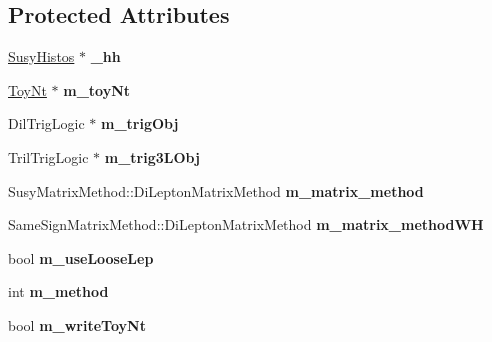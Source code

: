 \subsection*{Protected Attributes}
\begin{DoxyCompactItemize}
\item 
\hypertarget{classSusyBaseAna_a367bd65db63346df07ddd580294af668}{
\hyperlink{classSusyHistos}{SusyHistos} $\ast$ {\bfseries \_\-hh}}
\label{classSusyBaseAna_a367bd65db63346df07ddd580294af668}

\item 
\hypertarget{classSusyBaseAna_a442fc5acd64350b7af670237a3caa2bd}{
\hyperlink{classToyNt}{ToyNt} $\ast$ {\bfseries m\_\-toyNt}}
\label{classSusyBaseAna_a442fc5acd64350b7af670237a3caa2bd}

\item 
\hypertarget{classSusyBaseAna_a222bf62a46a03eebda35c795d0e1f46b}{
DilTrigLogic $\ast$ {\bfseries m\_\-trigObj}}
\label{classSusyBaseAna_a222bf62a46a03eebda35c795d0e1f46b}

\item 
\hypertarget{classSusyBaseAna_ae93079dc51825393f6c3f70759a03f2d}{
TrilTrigLogic $\ast$ {\bfseries m\_\-trig3LObj}}
\label{classSusyBaseAna_ae93079dc51825393f6c3f70759a03f2d}

\item 
\hypertarget{classSusyBaseAna_ae5de4586a5d7d2eb20f1ad4ce8ed87d6}{
SusyMatrixMethod::DiLeptonMatrixMethod {\bfseries m\_\-matrix\_\-method}}
\label{classSusyBaseAna_ae5de4586a5d7d2eb20f1ad4ce8ed87d6}

\item 
\hypertarget{classSusyBaseAna_ac1177a441f9e79e014cc936c98e9dca9}{
SameSignMatrixMethod::DiLeptonMatrixMethod {\bfseries m\_\-matrix\_\-methodWH}}
\label{classSusyBaseAna_ac1177a441f9e79e014cc936c98e9dca9}

\item 
\hypertarget{classSusyBaseAna_a7c2b27602fc8ca489a91a8a679c427ce}{
bool {\bfseries m\_\-useLooseLep}}
\label{classSusyBaseAna_a7c2b27602fc8ca489a91a8a679c427ce}

\item 
\hypertarget{classSusyBaseAna_a8655efab2d0fe20e78ce15b78ad53e67}{
int {\bfseries m\_\-method}}
\label{classSusyBaseAna_a8655efab2d0fe20e78ce15b78ad53e67}

\item 
\hypertarget{classSusyBaseAna_a2e19b9c79b7cee0f7940cf0e70297fe6}{
bool {\bfseries m\_\-writeToyNt}}
\label{classSusyBaseAna_a2e19b9c79b7cee0f7940cf0e70297fe6}


\end{DoxyCompactItemize}
